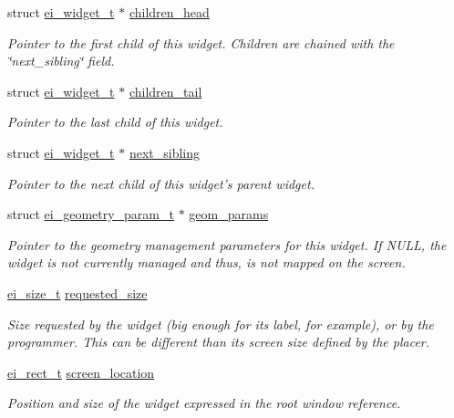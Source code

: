 \begin{DoxyCompactItemize}
struct \hyperlink{structei__widget__t}{ei\-\_\-widget\-\_\-t} $\ast$ \hyperlink{structei__widget__t_a190316f0ec41d2d98b919414c860f828}{children\-\_\-head}
\begin{DoxyCompactList}\small\item\em Pointer to the first child of this widget. Children are chained with the \char`\"{}next\-\_\-sibling\char`\"{} field. \end{DoxyCompactList}\item 
struct \hyperlink{structei__widget__t}{ei\-\_\-widget\-\_\-t} $\ast$ \hyperlink{structei__widget__t_aece2f3059f252538ae787857e7eea2a2}{children\-\_\-tail}
\begin{DoxyCompactList}\small\item\em Pointer to the last child of this widget. \end{DoxyCompactList}\item 
struct \hyperlink{structei__widget__t}{ei\-\_\-widget\-\_\-t} $\ast$ \hyperlink{structei__widget__t_ada15cedaf8e6e104a1461c1754ff6cb3}{next\-\_\-sibling}
\begin{DoxyCompactList}\small\item\em Pointer to the next child of this widget's parent widget. \end{DoxyCompactList}\item 
struct \hyperlink{structei__geometry__param__t}{ei\-\_\-geometry\-\_\-param\-\_\-t} $\ast$ \hyperlink{structei__widget__t_a31885277c641803a931fff1d6256203f}{geom\-\_\-params}
\begin{DoxyCompactList}\small\item\em Pointer to the geometry management parameters for this widget. If N\-U\-L\-L, the widget is not currently managed and thus, is not mapped on the screen. \end{DoxyCompactList}\item 
\hyperlink{structei__size__t}{ei\-\_\-size\-\_\-t} \hyperlink{structei__widget__t_ae82b19958b3ec72a855986dffb9b92ea}{requested\-\_\-size}
\begin{DoxyCompactList}\small\item\em Size requested by the widget (big enough for its label, for example), or by the programmer. This can be different than its screen size defined by the placer. \end{DoxyCompactList}\item 
\hyperlink{structei__rect__t}{ei\-\_\-rect\-\_\-t} \hyperlink{structei__widget__t_ad139e1541329b54e0b4c8d746e14b204}{screen\-\_\-location}
\begin{DoxyCompactList}\small\item\em Position and size of the widget expressed in the root window reference. \end{DoxyCompactList}\item 

\end{DoxyCompactItemize}
